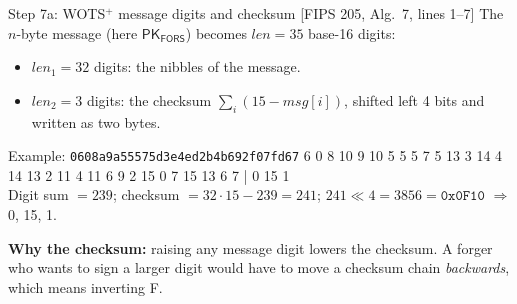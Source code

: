 \documentclass[aspectratio=169,11pt]{beamer}
\newcommand{\hx}[1]{\texttt{#1}}
\newcommand{\pk}[1]{\textcolor{pub}{#1}}
\newcommand{\alg}[1]{\textcolor{quiet}{\footnotesize[FIPS 205, Alg.~#1]}}
\begin{document}
\begin{frame}{Step 7a: WOTS$^+$ message digits and checksum \alg{7, lines 1--7}}
  The $n$-byte message (here \pk{$\mathsf{PK}_{\mathsf{FORS}}$}) becomes $\mathit{len} = 35$ base-16 digits:
  \begin{itemize}
    \item $\mathit{len}_1 = 32$ digits: the nibbles of the message.
    \item $\mathit{len}_2 = 3$ digits: the checksum $\sum_i (15 - \mathit{msg}[i])$, shifted left 4 bits and written as two bytes.
  \end{itemize}
  \vspace{2mm}
  \begin{block}{Example: \hx{0608a9a55575d3e4ed2b4b692f07fd67}}
    \footnotesize
     6 0 8 10 9 10 5 5 5 7 5 13 3 14 4 14 13 2 11 4 11 6 9 2 15 0 7 15 13 6 7 \;\textcolor{accent}{| 0 15 1}\\[1mm]
    \sffamily Digit sum $= 239$; checksum $= 32\cdot 15 - 239 = 241$; $241 \ll 4 = 3856 = \hx{0x0F10}$ $\Rightarrow$ \textcolor{accent}{0, 15, 1}.
  \end{block}
  \vspace{1mm}
  \small\textbf{Why the checksum:} raising any message digit lowers the checksum. A forger who wants to sign a larger digit would have to move a checksum chain \emph{backwards}, which means inverting F.
\end{frame}
\end{document}
